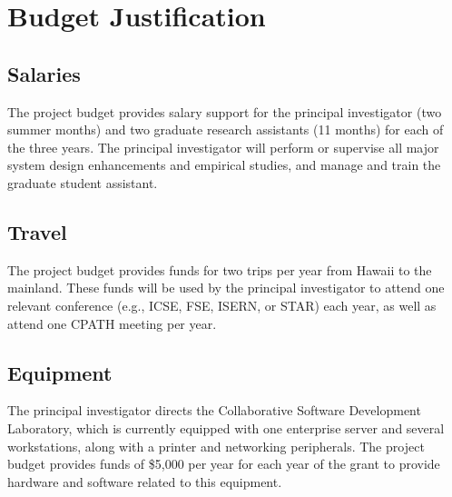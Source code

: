 

\section*{Budget Justification}

\renewcommand{\thepage} {F--\arabic{page}}

\subsection*{Salaries}

The project budget provides salary support for the principal investigator
(two summer months) and two graduate research
assistants (11 months) for each of the three years.  The principal
investigator will perform or supervise all major system design enhancements
and empirical studies, and manage and train the graduate student
assistant.

\subsection*{Travel}

The project budget provides funds for two trips per year from Hawaii to the
mainland.  These funds will be used by the principal investigator to attend
one relevant conference (e.g., ICSE, FSE, ISERN, or STAR) each year, as well 
as attend one CPATH meeting per year. 

\subsection*{Equipment}

The principal investigator directs the Collaborative Software Development
Laboratory, which is currently equipped with one enterprise server and several
workstations, along with a printer and networking peripherals.  The project
budget provides funds of \$5,000 per year for each year of the grant to
provide hardware and software related to this equipment.

